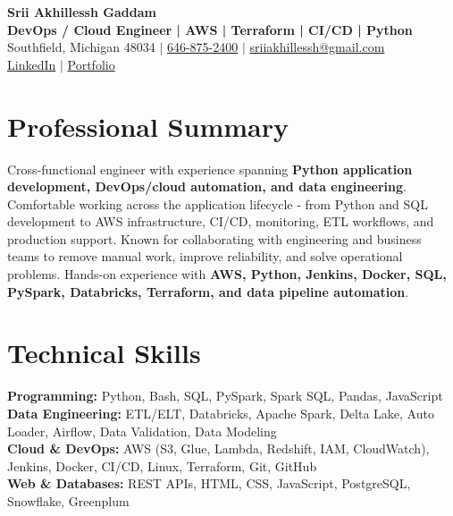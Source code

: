 \documentclass[letterpaper,10pt]{article}
\begin{document}
\fontsize{9.35pt}{10.45pt}\selectfont

\begin{center}
    {\LARGE \textbf{Srii Akhillessh Gaddam}} \\[-1pt]
    \textbf{DevOps / Cloud Engineer | AWS | Terraform | CI/CD | Python} \\[2pt]
    Southfield, Michigan 48034 $|$
    \href{tel:6468752400}{646-875-2400} $|$
    \href{mailto:sriiakhillessh@gmail.com}{sriiakhillessh@gmail.com} \\[1pt]
    \href{https://www.linkedin.com/in/srii-akhiilessh-gaddam-b48668191/}{LinkedIn} $|$
    \href{https://sriiakhillesshg.github.io/portfolio/}{Portfolio}
\end{center}
\vspace{-8pt}

\section{Professional Summary}
\small{Cross-functional engineer with experience spanning \textbf{Python application development, DevOps/cloud automation, and data engineering}. Comfortable working across the application lifecycle - from Python and SQL development to AWS infrastructure, CI/CD, monitoring, ETL workflows, and production support. Known for collaborating with engineering and business teams to remove manual work, improve reliability, and solve operational problems. Hands-on experience with \textbf{AWS, Python, Jenkins, Docker, SQL, PySpark, Databricks, Terraform, and data pipeline automation}.}

\section{Technical Skills}
\small{
\textbf{Programming:} Python, Bash, SQL, PySpark, Spark SQL, Pandas, JavaScript \\
\textbf{Data Engineering:} ETL/ELT, Databricks, Apache Spark, Delta Lake, Auto Loader, Airflow, Data Validation, Data Modeling \\
\textbf{Cloud \& DevOps:} AWS (S3, Glue, Lambda, Redshift, IAM, CloudWatch), Jenkins, Docker, CI/CD, Linux, Terraform, Git, GitHub \\
\textbf{Web \& Databases:} REST APIs, HTML, CSS, JavaScript, PostgreSQL, Snowflake, Greenplum
}
\end{document}
